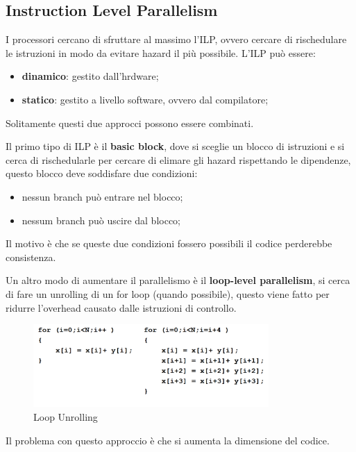 \documentclass[12pt]{article}
\begin{document}
\subsection{Instruction Level Parallelism}
I processori cercano di sfruttare al massimo l'ILP, ovvero cercare di rischedulare le istruzioni in modo da evitare hazard il pi\`u possibile. L'ILP pu\`o essere:
\begin{itemize}
    \item \textbf{dinamico}: gestito dall'hrdware;
    \item \textbf{statico}: gestito a livello software, ovvero dal compilatore;
\end{itemize}
Solitamente questi due approcci possono essere combinati.

Il primo tipo di ILP \`e il \textbf{basic block}, dove si sceglie un blocco di istruzioni e si cerca di rischedularle per cercare di elimare gli hazard rispettando le dipendenze, questo blocco deve soddisfare due condizioni:
\begin{itemize}
    \item nessun branch pu\`o entrare nel blocco;
    \item nessum branch pu\`o uscire dal blocco;
\end{itemize}
Il motivo \`e che se queste due condizioni fossero possibili il codice perderebbe consistenza.

Un altro modo di aumentare il parallelismo \`e il \textbf{loop-level parallelism}, si cerca di fare un unrolling di un for loop (quando possibile), questo viene fatto per ridurre l'overhead causato dalle istruzioni di controllo.
\begin{figure}[H]
    \centering
    \includegraphics[width=0.8\textwidth]{loop-unrolling.png}
    \caption{Loop Unrolling}
    \label{fig:loop-unrolling}
\end{figure}
Il problema con questo approccio \`e che si aumenta la dimensione del codice.








\newpage
\end{document}
